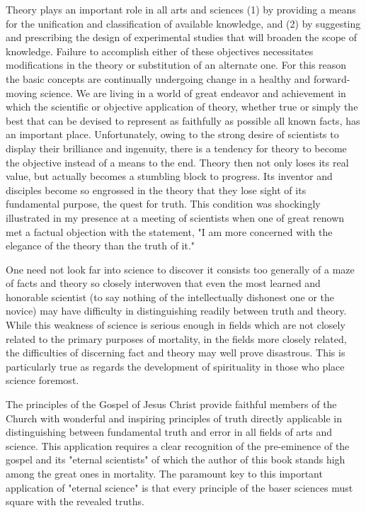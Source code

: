 Theory plays an important role in all arts and sciences (1) by providing a means for the
unification and classification of available knowledge, and (2) by suggesting and prescribing
the design of experimental studies that will broaden the scope of knowledge. Failure to
accomplish either of these objectives necessitates modifications in the theory or substitution
of an alternate one. For this reason the basic concepts are continually undergoing change in a
healthy and forward-moving science. We are living in a world of great endeavor and
achievement in which the scientific or objective application of theory, whether true or simply
the best that can be devised to represent as faithfully as possible all known facts, has an
important place. Unfortunately, owing to the strong desire of scientists to display their
brilliance and ingenuity, there is a tendency for theory to become the objective instead of a
means to the end. Theory then not only loses its real value, but actually becomes a stumbling
block to progress. Its inventor and disciples become so engrossed in the theory that they lose
sight of its fundamental purpose, the quest for truth. This condition was shockingly
illustrated in my presence at a meeting of scientists when one of great renown met a factual
objection with the statement, "I am more concerned with the elegance of the theory than the
truth of it."

One need not look far into science to discover it consists too generally of a maze of facts and
theory so closely interwoven that even the most learned and honorable scientist (to say
nothing of the intellectually dishonest one or the novice) may have difficulty in
distinguishing readily between truth and theory. While this weakness of science is serious
enough in fields which are not closely related to the primary purposes of mortality, in the
fields more closely related, the difficulties of discerning fact and theory may well prove
disastrous. This is particularly true as regards the development of spirituality in those who
place science foremost.

The principles of the Gospel of Jesus Christ provide faithful members of the Church with
wonderful and inspiring principles of truth directly applicable in distinguishing between
fundamental truth and error in all fields of arts and science. This application requires a clear
recognition of the pre-eminence of the gospel and its "eternal scientists" of which the author
of this book stands high among the great ones in mortality. The paramount key to this
important application of "eternal science" is that every principle of the baser sciences must
square with the revealed truths.


